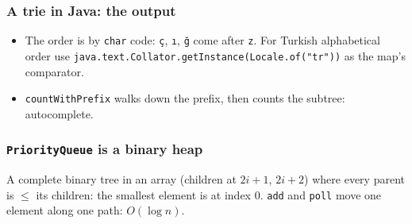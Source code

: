 \documentclass[aspectratio=169,10pt,compress]{beamer}
\begin{document}
\begin{frame}[t,fragile] \frametitle{A trie in Java: the output}
  \begin{itemize}\small
    \item The order is by \texttt{char} code: \texttt{ç}, \texttt{ı}, \texttt{ğ} come after \texttt{z}. For Turkish alphabetical order use
          \texttt{java.text.Collator.getInstance(Locale.of("tr"))} as the map's comparator.
    \item \texttt{countWithPrefix} walks down the prefix, then counts the subtree: autocomplete.
  \end{itemize}
\end{frame}





\begin{frame}[t,fragile] \frametitle{\texttt{PriorityQueue} is a binary heap}

  \vspace{0.2em}
  \small A complete binary tree in an array (children at $2i + 1$, $2i + 2$) where every parent is $\le$ its children:
  the smallest element is at index 0. \texttt{add} and \texttt{poll} move one element along one path: $O(\log n)$.
\end{frame}
\end{document}
